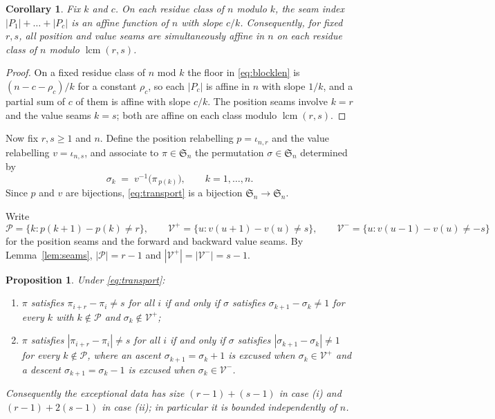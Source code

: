 \documentclass[11pt]{article}
\newtheorem{proposition}[theorem]{Proposition}
\newtheorem{corollary}[theorem]{Corollary}
\theoremstyle{definition}
\newcommand{\Sn}{\mathfrak{S}_n}
\begin{document}
\begin{corollary}\label{cor:affine}
Fix $k$ and $c$. On each residue class of $n$ modulo $k$, the seam index
$|P_1|+\dots+|P_c|$ is an affine function of $n$ with slope $c/k$. Consequently,
for fixed $r,s$, all position and value seams are simultaneously affine in $n$
on each residue class of $n$ modulo $\operatorname{lcm}(r,s)$.
\end{corollary}

\begin{proof}
On a fixed residue class of $n$ mod $k$ the floor in \eqref{eq:blocklen} is
$(n-c-\rho_c)/k$ for a constant $\rho_c$, so each $|P_c|$ is affine in $n$ with
slope $1/k$, and a partial sum of $c$ of them is affine with slope $c/k$. The
position seams involve $k=r$ and the value seams $k=s$; both are affine on each
class modulo $\operatorname{lcm}(r,s)$.
\end{proof}

Now fix $r,s\ge 1$ and $n$. Define the position relabelling
$p=\iota_{n,r}$ and the value relabelling $v=\iota_{n,s}$, and associate to
$\pi\in\Sn$ the permutation $\sigma\in\Sn$ determined by
\begin{equation}\label{eq:transport}
  \sigma_k \;=\; v^{-1}\bigl(\pi_{\,p(k)}\bigr), \qquad k=1,\dots,n .
\end{equation}
Since $p$ and $v$ are bijections, \eqref{eq:transport} is a bijection
$\Sn\to\Sn$.

Write
\[
  \mathcal{P} = \{k : p(k+1)-p(k)\neq r\},\qquad
  \mathcal{V}^{+} = \{u : v(u+1)-v(u)\neq s\},\qquad
  \mathcal{V}^{-} = \{u : v(u-1)-v(u)\neq -s\}
\]
for the position seams and the forward and backward value seams. By
Lemma~\ref{lem:seams}, $|\mathcal{P}|=r-1$ and
$|\mathcal{V}^{+}|=|\mathcal{V}^{-}|=s-1$.

\begin{proposition}\label{prop:transport}
Under \eqref{eq:transport}:
\begin{enumerate}
\item[(i)] $\pi$ satisfies $\pi_{i+r}-\pi_i\neq s$ for all $i$ if and only if
$\sigma$ satisfies $\sigma_{k+1}-\sigma_k\neq 1$ for every $k$ with
$k\notin\mathcal{P}$ and $\sigma_k\notin\mathcal{V}^{+}$;
\item[(ii)] $\pi$ satisfies $|\pi_{i+r}-\pi_i|\neq s$ for all $i$ if and only if
$\sigma$ satisfies $|\sigma_{k+1}-\sigma_k|\neq 1$ for every $k\notin\mathcal{P}$,
where an ascent $\sigma_{k+1}=\sigma_k+1$ is excused when
$\sigma_k\in\mathcal{V}^{+}$ and a descent $\sigma_{k+1}=\sigma_k-1$ is excused
when $\sigma_k\in\mathcal{V}^{-}$.
\end{enumerate}
Consequently the exceptional data has size $(r-1)+(s-1)$ in case (i) and
$(r-1)+2(s-1)$ in case (ii); in particular it is bounded independently of $n$.
\end{proposition}
\end{document}
